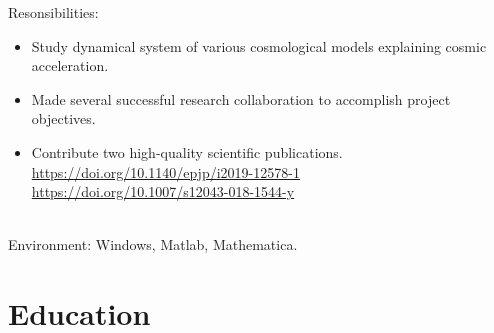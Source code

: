 \documentclass[letterpaper]{templatecv} %
\begin{document}
\begin{twenty}
{        Resonsibilities: 
        \begin{itemize}
            \item Study dynamical system of various cosmological models explaining cosmic acceleration.  
            \item Made several successful research collaboration to accomplish project objectives. 
            \item Contribute two high-quality scientific publications.\\ \url{https://doi.org/10.1140/epjp/i2019-12578-1}\\ \url{https://doi.org/10.1007/s12043-018-1544-y}
        \end{itemize}\\
        Environment: Windows, Matlab, Mathematica.

        
   }
       \end{twenty}
        

    


\section{Education}
\end{document}
